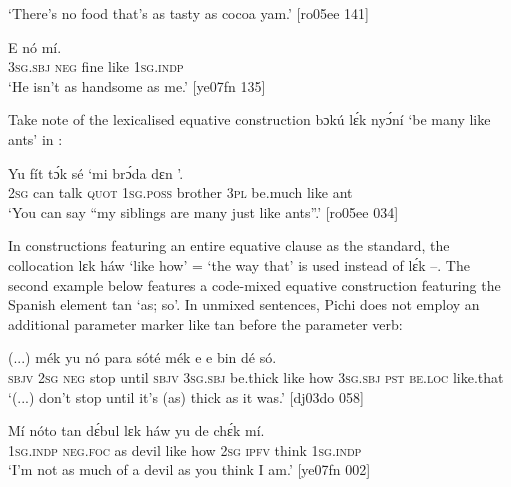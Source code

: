 \glt ‘There’s no food that’s as tasty as cocoa yam.’ [ro05ee 141]
\z


\ea%
    \label{ex:key:506}
    \gll E    nó      mí.\\
\textsc{3sg.sbj}  \textsc{neg}  fine    like  \textsc{1sg.indp}\\

\glt ‘He isn’t as handsome as me.’ [ye07fn 135]
\z

Take note of the lexicalised equative construction bɔkú lɛ́k nyɔ́ní ‘be many like ants’ in : 


\ea%
    \label{ex:key:507}
    \gll Yu  fít  tɔ́k  sé    ‘mi    brɔ́da  dɛn     ’.\\
\textsc{2sg}  can  talk  \textsc{quot}    \textsc{1sg.poss}  brother  \textsc{3pl}  be.much  like  ant\\

\glt ‘You can say “my siblings are many just like ants”.’ [ro05ee 034]
\z

In constructions featuring an entire equative clause as the standard, the collocation lɛk háw ‘like how’ = ‘the way that’ is used instead of lɛ́k –. The second example below features a code-mixed equative construction featuring the Spanish element tan ‘as; so’. In unmixed sentences, Pichi does not employ an additional parameter marker like tan before the parameter verb:


\ea%
\label{ex:key:508}
\gll  (...)  mék    yu  nó  para    sóté    mék    e          
e    bin  dé    só.\\
{}  \textsc{sbjv}    \textsc{2sg}  \textsc{neg}  stop    until  \textsc{sbjv}    \textsc{3sg.sbj}  be.thick  like  how  
\textsc{3sg.sbj}  \textsc{pst}  \textsc{be.loc}  like.that \\
\glt ‘(...) don’t stop until it’s (as) thick as it was.’ [dj03do 058]
\z


\ea%
    \label{ex:key:509}
    \gll Mí    nóto  tan  dɛ́bul  lɛk  háw    yu  de  chɛ́k  mí.\\
\textsc{1sg.indp}  \textsc{neg}.\textsc{foc}  as  devil  like  how    \textsc{2sg}  \textsc{ipfv}  think  \textsc{1sg.indp}\\

\glt ‘I’m not as much of a devil as you think I am.’ [ye07fn 002]
\z

